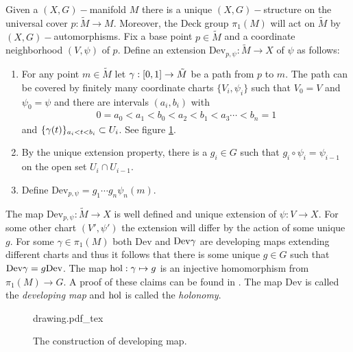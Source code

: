 Given a $(X,G)-$manifold $M$ there is a unique $(X,G)-$structure on the universal cover $p:\tilde{M}\to M$. Moreover, the Deck group $\pi_1(M)$ will act on $\tilde{M}$ by $(X,G)-$automorphisms. Fix a base point $p\in \tilde{M}$ and a coordinate neighborhood $(V,\psi)$ of $p$. Define an extension $\text{Dev}_{p,\psi}:\tilde{M}\to X$ of $\psi$ as follows:
\begin{enumerate}
  \item For any point $m\in \tilde{M}$ let $\gamma:[0,1]\to \tilde{M}$ be a path from $p$ to $m$. The path can be covered by finitely many coordinate charts $\{V_i, \psi_i\}$ such that $V_0 = V$ and $\psi_0 = \psi$ and there are intervals $(a_i,b_i)$ with
    \begin{align}
      0=a_0< a_1 < b_0 < a_2 < b_1 < a_3 \cdots < b_n = 1 
    \end{align}
    and $\{\gamma(t)\}_{a_i< t < b_i}\subset U_i$. See figure \ref{fig:dev}.
  \item By the unique extension property, there is a $g_i\in G$ such that $g_i\circ \psi_i = \psi_{i-1}$ on the open set $U_i\cap U_{i-1}$.
  \item Define $\text{Dev}_{p,\psi} = g_1\cdots g_n \psi_n(m)$. 
\end{enumerate}
The map $\text{Dev}_{p,\psi}:\tilde{M}\to X$ is well defined and unique extension of $\psi:V\to X$. For some other chart $(V',\psi')$ the extension will differ by the action of some unique $g$. For some $\gamma\in \pi_1(M)$ both $\text{Dev}$ and $\text{Dev}\gamma$ are developing maps extending different charts and thus it follows that there is some unique $g\in G$ such that $\text{Dev}\gamma = g\text{Dev}$. The map $\text{hol}:\gamma\mapsto g$ is an injective homomorphism from $\pi_1(M)\to G$. A proof of these claims can be found in \cite{ratcliffe}. The map $\text{Dev}$ is called the \textit{developing map} and $\text{hol}$ is called the \textit{holonomy}.\\

\begin{figure}
  \centering
  \def\svgwidth{0.7\textwidth}
  {drawing.pdf_tex}
  \caption[Developing map.]{The construction of developing map.}
  \label{fig:dev}
\end{figure}

